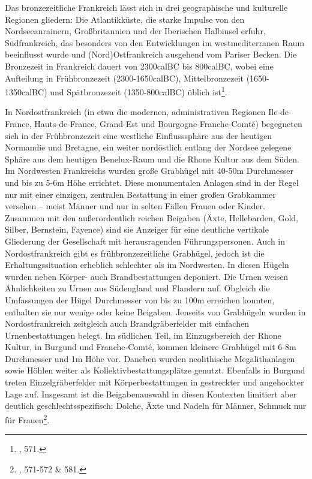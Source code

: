 \documentclass[openany,twoside,twocolumn]{book}
\let\rmarkdownfootnote\footnote%
\def\footnote{\protect\rmarkdownfootnote}
\begin{document}
Das bronzezeitliche Frankreich lässt sich in drei geographische und
kulturelle Regionen gliedern: Die Atlantikküste, die starke Impulse von
den Nordseeanrainern, Großbritannien und der Iberischen Halbinsel
erfuhr, Südfrankreich, das besonders von den Entwicklungen im
westmediterranen Raum beeinflusst wurde und (Nord)Ostfrankreich
ausgehend vom Pariser Becken. Die Bronzezeit in Frankreich dauert von
2300calBC bis 800calBC, wobei eine Aufteilung in Frühbronzezeit
(2300-1650calBC), Mittelbronzezeit (1650-1350calBC) und Spätbronzezeit
(1350-800calBC) üblich ist\footnote{\textcite{mordant_bronze_2013}, 571.}.

In Nordostfrankreich (in etwa die modernen, administrativen Regionen
Ile-de-France, Hauts-de-France, Grand-Est und Bourgogne-Franche-Comté)
begegneten sich in der Frühbronzezeit eine westliche Einflusssphäre aus
der heutigen Normandie und Bretagne, ein weiter nordöstlich entlang der
Nordsee gelegene Sphäre aus dem heutigen Benelux-Raum und die Rhone
Kultur aus dem Süden. Im Nordwesten Frankreichs wurden große Grabhügel
mit 40-50m Durchmesser und bis zu 5-6m Höhe errichtet. Diese
monumentalen Anlagen sind in der Regel nur mit einer einzigen, zentralen
Bestattung in einer großen Grabkammer versehen -- meist Männer und nur
in selten Fällen Frauen oder Kinder. Zusammen mit den außerordentlich
reichen Beigaben (Äxte, Hellebarden, Gold, Silber, Bernstein, Fayence)
sind sie Anzeiger für eine deutliche vertikale Gliederung der
Gesellschaft mit herausragenden Führungspersonen. Auch in
Nordostfrankreich gibt es frühbronzezeitliche Grabhügel, jedoch ist die
Erhaltungssituation erheblich schlechter als im Nordwesten. In diesen
Hügeln wurden neben Körper- auch Brandbestattungen deponiert. Die Urnen
weisen Ähnlichkeiten zu Urnen aus Südengland und Flandern auf. Obgleich
die Umfassungen der Hügel Durchmesser von bis zu 100m erreichen konnten,
enthalten sie nur wenige oder keine Beigaben. Jenseits von Grabhügeln
wurden in Nordostfrankreich zeitgleich auch Brandgräberfelder mit
einfachen Urnenbestattungen belegt. Im südlichen Teil, im Einzugsbereich
der Rhone Kultur, in Burgund und Franche-Comté, kommen kleinere
Grabhügel mit 6-8m Durchmesser und 1m Höhe vor. Daneben wurden
neolithische Megalithanlagen sowie Höhlen weiter als
Kollektivbestattungsplätze genutzt. Ebenfalls in Burgund treten
Einzelgräberfelder mit Körperbestattungen in gestreckter und angehockter
Lage auf. Insgesamt ist die Beigabenauswahl in diesen Kontexten
limitiert aber deutlich geschlechtsspezifisch: Dolche, Äxte und Nadeln
für Männer, Schmuck nur für Frauen\footnote{\textcite{mordant_bronze_2013},
  571-572 \& 581.}.
\end{document}
